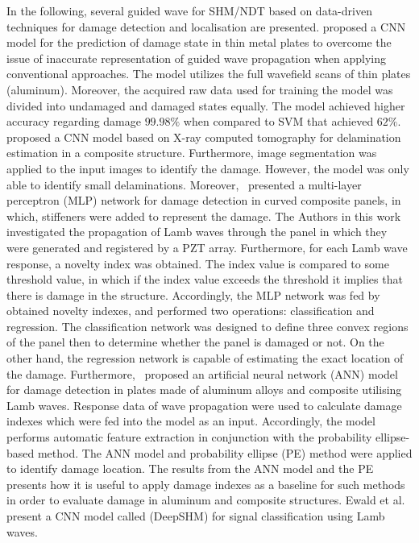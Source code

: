 In the following, several guided wave for SHM/NDT based on data-driven techniques for damage detection and localisation are presented.
\textcite{Melville1949} proposed a CNN model for the prediction of damage state in thin metal plates to overcome the issue of inaccurate representation of guided wave propagation when applying conventional approaches. 
The model utilizes the full wavefield scans of thin plates (aluminum).
Moreover, the acquired raw data used for training the model was divided into undamaged and damaged states equally.
The model achieved higher accuracy regarding damage  \(99.98\%\) when compared to SVM that achieved \(62\%\).
\textcite{Sammons2016} proposed a CNN model based on X-ray computed tomography for delamination estimation in a composite structure.
Furthermore, image segmentation was applied to the input images to identify the damage.
However, the model was only able to identify small delaminations.
Moreover,~\textcite{Chetwynd2008} presented a multi-layer perceptron (MLP) network for damage detection in curved composite panels, in which, stiffeners were added to represent the damage.
The Authors in this work investigated the propagation of Lamb waves through the panel in which they were generated and registered by a PZT array.
Furthermore, for each Lamb wave response, a novelty index was obtained.
The index value is compared to some threshold value, in which if the index value exceeds the threshold it implies that there is damage in the structure.
Accordingly, the MLP network was fed by obtained novelty indexes, and performed two operations: classification and regression.
The classification network was designed to define three convex regions of the panel then to determine whether the panel is damaged or not.
On the other hand, the regression network is capable of estimating the exact location of the damage.
Furthermore,~\textcite{DeFenza2015} proposed an artificial neural network (ANN) model for damage detection in plates made of aluminum alloys and composite utilising Lamb waves.
Response data of wave propagation were used to calculate damage indexes which were fed into the model as an input.
Accordingly, the model performs automatic feature extraction in conjunction with the probability ellipse-based method. 
The ANN model and probability ellipse (PE) method were applied to identify damage location.
The results from the ANN model and the PE presents how it is useful to apply damage indexes as a baseline for such methods in order to evaluate damage in aluminum and composite structures. 
Ewald et al.~\cite{Ewald2019} present a CNN model called (DeepSHM) for signal classification using Lamb waves.

